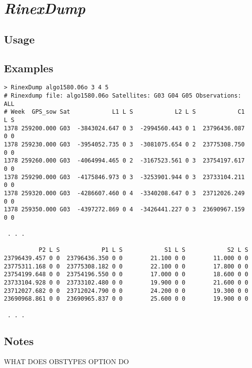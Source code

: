 \section{\emph{RinexDump}}
\subsection{Usage}
\subsection{Examples}
\begin{verbatim}
> RinexDump algo1580.06o 3 4 5
# Rinexdump file: algo1580.06o Satellites: G03 G04 G05 Observations: ALL
# Week  GPS_sow Sat            L1 L S            L2 L S            C1 L S
1378 259200.000 G03  -3843024.647 0 3  -2994560.443 0 1  23796436.087 0 0
1378 259230.000 G03  -3954052.735 0 3  -3081075.654 0 2  23775308.750 0 0
1378 259260.000 G03  -4064994.465 0 2  -3167523.561 0 3  23754197.617 0 0
1378 259290.000 G03  -4175846.973 0 3  -3253901.944 0 3  23733104.211 0 0
1378 259320.000 G03  -4286607.460 0 4  -3340208.647 0 3  23712026.249 0 0
1378 259350.000 G03  -4397272.869 0 4  -3426441.227 0 3  23690967.159 0 0

 . . .

          P2 L S            P1 L S            S1 L S            S2 L S
23796439.457 0 0  23796436.350 0 0        21.100 0 0        11.000 0 0
23775311.168 0 0  23775308.182 0 0        22.100 0 0        17.800 0 0
23754199.648 0 0  23754196.550 0 0        17.000 0 0        18.600 0 0
23733104.928 0 0  23733102.480 0 0        19.900 0 0        21.600 0 0
23712027.682 0 0  23712024.790 0 0        24.200 0 0        19.300 0 0
23690968.861 0 0  23690965.837 0 0        25.600 0 0        19.900 0 0

 . . .
\end{verbatim}
\subsection{Notes}
WHAT DOES OBSTYPES OPTION DO
